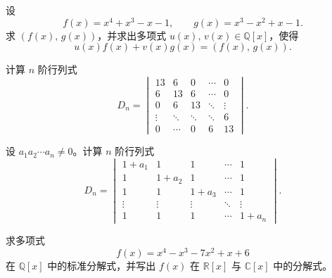 \documentclass[11pt,a4paper,fontset=windows]{ctexart}
\begin{document}
\begin{qs}
\item 设
\[
f(x)=x^{4}+x^{3}-x-1,\qquad g(x)=x^{3}-x^{2}+x-1 .
\]
求 $(f(x),\,g(x))$，并求出多项式 $u(x),\,v(x)\in\mathbb{Q}[x]$，使得
\[
u(x)f(x)+v(x)g(x)=(f(x),\,g(x)).
\]

\item 计算 $n$ 阶行列式
\[
D_n=\begin{vmatrix}
13 & 6 & 0 & \cdots & 0\\
6 & 13 & 6 & \cdots & 0\\
0 & 6 & 13 & \ddots & \vdots\\
\vdots & \ddots & \ddots & \ddots & 6\\
0 & \cdots & 0 & 6 & 13
\end{vmatrix}.
\]

\item 设 $a_1a_2\cdots a_n\neq 0$。计算 $n$ 阶行列式
\[
D_n=\begin{vmatrix}
1+a_1 & 1 & 1 & \cdots & 1\\
1 & 1+a_2 & 1 & \cdots & 1\\
1 & 1 & 1+a_3 & \cdots & 1\\
\vdots & \vdots & \vdots & \ddots & \vdots\\
1 & 1 & 1 & \cdots & 1+a_n
\end{vmatrix}.
\]

\item 求多项式
\[
f(x)=x^{4}-x^{3}-7x^{2}+x+6
\]
在 $\mathbb{Q}[x]$ 中的标准分解式，并写出 $f(x)$ 在 $\mathbb{R}[x]$ 与 $\mathbb{C}[x]$ 中的分解式。
\end{qs}
\end{document}
